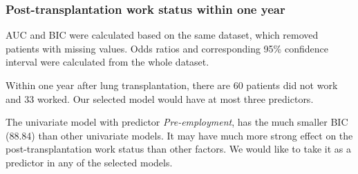 \documentclass[11pt, a4paper]{article}\usepackage[]{graphicx}\usepackage[]{color}
\begin{document}
{\subsubsection*{Post-transplantation work status within one year} \label{subsubsec:logis1}



\begin{table}[ht]
\centering
\caption{Univariate models for work status 
                within one year after LTx} 
\end{table}



AUC and BIC were calculated based on the same dataset, which removed patients with missing values. Odds ratios and corresponding 95\% confidence interval were calculated from the whole dataset. 

Within one year after lung transplantation, there are 60 patients did not work and 33 worked. Our selected model would have at most three predictors.

The univariate model with predictor \textit{Pre-employment}, has the much smaller BIC (88.84) than other univariate models. It may have much more strong effect on the post-transplantation work status than other factors. We would like to take it as a predictor in any of the selected models. 

}
\end{document}
